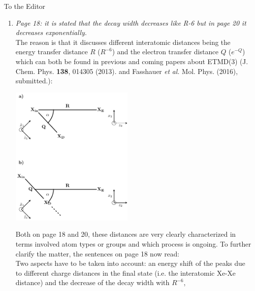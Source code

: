 \documentclass[DIN,pagenumber=false,parskip=half,fromalign=left,fromphone=true,fromemail=true,fromurl=false,fromlogo=false,fromrule=false]{scrlttr2}
\begin{document}
\begin{letter}{To the Editor}
\begin{enumerate}
        different. The 14 atom cluster has only a few more pairs which are
        characterized by comparably small distances. Therefore, each of these
        pairs will have a significant decay width. In case of the 56 atoms
        cluster there are many pairs with open channels characterized by many
        different distances and especially much larger distances than in the
        14 atoms cluster. Therefore, the average decay width is smaller in the
        56 atoms cluster than in the 14 atoms cluster.
        The reviewers intuition would be correct if the atom types of argon
        and xenon atoms were interchanged.

  \item \emph{Page 18:
        it is stated that the decay width decreases like R-6 but in page 20 it decreases exponentially.}\\
        The reason is that it discusses different interatomic distances being
        the energy transfer distance $R$ ($R^{-6}$) and the electron
        transfer distance $Q$ ($e^{-Q}$) which can both be found in previous and
        coming papers about ETMD(3) (J. Chem. Phys. \textbf{138}, 014305 (2013).
        and Fasshauer \emph{et al.} Mol. Phys. (2016), submitted.):
\begin{center}
 \includegraphics[width=6cm]{../pics/coord_systems.pdf}
\end{center}
        Both on page 18 and 20, these distances are very clearly characterized
        in terms involved atom types or groups and which process is ongoing.
        To further clarify the matter, the sentences on page 18 now read:\\
        Two aspects have to be taken into account: an energy shift of the peaks
        due to different charge distances {\color{blue}{$d$}} in the
        final state (i.e. the interatomic Xe-Xe
        distance) and the decrease of the decay width with $R^{-6}$,

\end{enumerate}
\end{letter}
\end{document}
